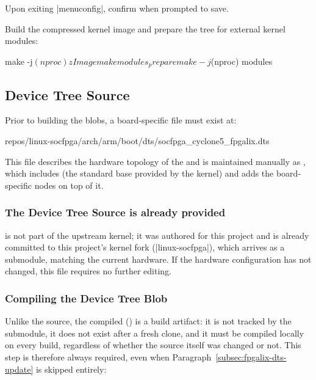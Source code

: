 Upon exiting |menuconfig|, confirm  when prompted to save.

Build the compressed kernel image and prepare the tree for external kernel modules:

\begin{shellcodehost}
make -j$(nproc) zImage
make modules_prepare
make -j$(nproc) modules
\end{shellcodehost}

\subsection{Device Tree Source}

Prior to building the  blobs, a board-specific  file must exist at:

\begin{shellcodehost}
repos/linux-socfpga/arch/arm/boot/dts/socfpga_cyclone5_fpgalix.dts
\end{shellcodehost}

This file describes the hardware topology of the  and is maintained manually as , which includes  (the standard  base provided by the kernel) and adds the board-specific nodes on top of it.

\subsubsection{The Device Tree Source is already provided}

 is not part of the upstream kernel; it was authored for this project and is already committed to this project's  kernel fork (|linux-socfpga|), which arrives as a submodule, matching the current hardware. If the  hardware configuration has not changed, this file requires no further editing.

\subsubsection{Compiling the Device Tree Blob}

Unlike the  source, the compiled  () is a build artifact: it is not tracked by the submodule, it does not exist after a fresh clone, and it must be compiled locally on every build, regardless of whether the  source itself was changed or not. This step is therefore always required, even when Paragraph~\ref{subsec:fpgalix-dts-update} is skipped entirely:

